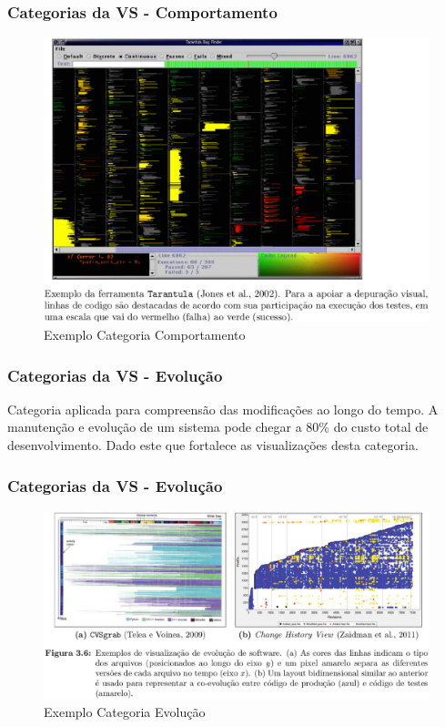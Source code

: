 \documentclass{beamer}
\begin{document}
\begin{frame}
\frametitle{Categorias da VS - Comportamento}

\begin{figure}[!htb]
  \centering
    \includegraphics[keepaspectratio=true,scale=0.26]
    {../figuras/exemplo_tarantula.eps}
  \caption{Exemplo Categoria Comportamento \cite{messias2012}}
  \label{fig:parallel}
\end{figure}


\end{frame}


\begin{frame}
\frametitle{Categorias da VS - Evolução}

\center
Categoria aplicada para compreensão das modificações ao longo do tempo. A manutenção e evolução de um sistema pode chegar a 80\% do custo total de desenvolvimento. Dado este que fortalece as visualizações desta categoria.


\end{frame}


\begin{frame}
\frametitle{Categorias da VS - Evolução}

\begin{figure}[!htb]
  \centering
    \includegraphics[keepaspectratio=true,scale=0.26]
    {../figuras/exemplo_evolucao.eps}
  \caption{Exemplo Categoria Evolução \cite{messias2012}}
  \label{fig:parallel}
\end{figure}


\end{frame}
\end{document}
